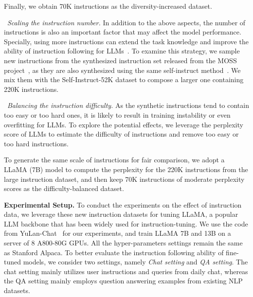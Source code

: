 Finally, we obtain 70K instructions as the diversity-increased dataset.

\textbullet~\emph{Scaling the instruction number.} In addition to the above aspects, the number of instructions is also an important factor that may affect the model performance. Specially, using more instructions can extend the task knowledge and improve the ability of instruction following for LLMs~\cite{Chung-arxiv-2022-Scaling}. To examine this strategy, we sample new instructions from the synthesized instruction set released from the MOSS project~\cite{sun2023moss}, {as they are also synthesized using the same self-instruct method~\cite{Wang-arXiv-2022-Self}.} We mix them with the Self-Instruct-52K dataset to compose a larger one containing 220K instructions. 

\textbullet~\emph{Balancing the instruction difficulty.} As the synthetic instructions tend to contain too easy or too hard ones, it is likely to result in training instability or even overfitting for LLMs. To explore the  potential effects, we leverage the perplexity score of LLMs to estimate the difficulty of instructions and remove  too easy or too hard instructions.  

To generate the same scale  of instructions for fair comparison, we adopt a LLaMA (7B) model to compute the perplexity for the 220K instructions from the large instruction dataset, and then keep 70K instructions of moderate perplexity scores as the difficulty-balanced dataset. 

\textbf{Experimental Setup.} To conduct the experiments on the effect of instruction data, we leverage these new instruction datasets for tuning LLaMA, a popular LLM backbone that has been widely used for instruction-tuning. We use the code from YuLan-Chat~\cite{YuLan-Chat} for our experiments,  and train LLaMA 7B and 13B on a server of 8 A800-80G GPUs. All the hyper-parameters settings remain the same as Stanford Alpaca. To better evaluate the  {instruction following ability of fine-tuned models, we consider two settings, namely 
\emph{Chat setting} and \emph{QA setting}. The chat setting mainly utilizes user instructions and queries from daily chat, whereas the QA setting mainly employs question answering examples from existing NLP datasets. }

